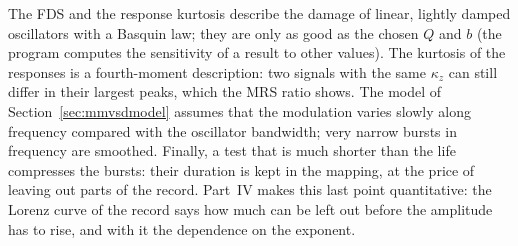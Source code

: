 The FDS and the response kurtosis describe the damage of linear, lightly damped oscillators with a
Basquin law; they are only as good as the chosen $Q$ and $b$ (the program computes the sensitivity of
a result to other values). The kurtosis of the responses is a fourth-moment description: two signals
with the same $\kappa_z$ can still differ in their largest peaks, which the MRS ratio shows. The
model of Section~\ref{sec:mmvsdmodel} assumes that the modulation varies slowly along frequency compared
with the oscillator bandwidth; very narrow bursts in frequency are smoothed. Finally, a test that is
much shorter than the life compresses the bursts: their duration is kept in the  mapping,
at the price of leaving out parts of the record. Part~IV makes this last point quantitative: the Lorenz
curve of the record says how much can be left out before the amplitude has to rise, and with it the
dependence on the exponent.
